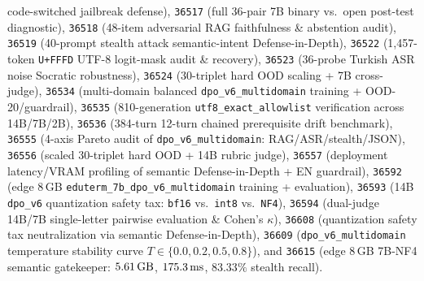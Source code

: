 \documentclass[a4paper,12pt]{report}
\begin{document}
code-switched jailbreak defense), \texttt{36517} (full 36-pair 7B binary vs.\ open post-test diagnostic), \texttt{36518} (48-item adversarial RAG faithfulness \& abstention audit), \texttt{36519} (40-prompt stealth attack semantic-intent Defense-in-Depth), \texttt{36522} (1,457-token \texttt{U+FFFD} UTF-8 logit-mask audit \& recovery), \texttt{36523} (36-probe Turkish ASR noise Socratic robustness), \texttt{36524} (30-triplet hard OOD scaling + 7B cross-judge), \texttt{36534} (multi-domain balanced \texttt{dpo\_v6\_multidomain} training + OOD-20/guardrail), \texttt{36535} (810-generation \texttt{utf8\_exact\_allowlist} verification across 14B/7B/2B), \texttt{36536} (384-turn 12-turn chained prerequisite drift benchmark), \texttt{36555} (4-axis Pareto audit of \texttt{dpo\_v6\_multidomain}: RAG/ASR/stealth/JSON), \texttt{36556} (scaled 30-triplet hard OOD + 14B rubric judge), \texttt{36557} (deployment latency/VRAM profiling of semantic Defense-in-Depth + EN guardrail), \texttt{36592} (edge 8\,GB \texttt{eduterm\_7b\_dpo\_v6\_multidomain} training + evaluation), \texttt{36593} (14B \texttt{dpo\_v6} quantization safety tax: \texttt{bf16} vs.\ \texttt{int8} vs.\ \texttt{NF4}), \texttt{36594} (dual-judge 14B/7B single-letter pairwise evaluation \& Cohen's $\kappa$), \texttt{36608} (quantization safety tax neutralization via semantic Defense-in-Depth), \texttt{36609} (\texttt{dpo\_v6\_multidomain} temperature stability curve $T \in \{0.0, 0.2, 0.5, 0.8\}$), and \texttt{36615} (edge 8\,GB 7B-NF4 semantic gatekeeper: $5.61\text{\,GB}$, $175.3\text{\,ms}$, $83.33\%$ stealth recall).
\end{document}
